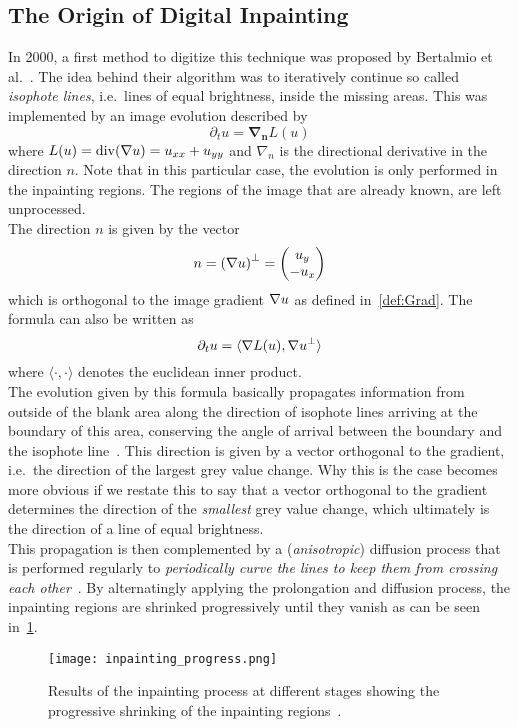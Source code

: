 \subsection{The Origin of Digital Inpainting}
In 2000, a first method to digitize this technique was proposed by Bertalmio et al.~\cite{bertalmio00}.
The idea behind their algorithm was to iteratively continue so called \textit{isophote
lines}, i.e.\ lines of equal brightness, inside the missing areas. 
This was implemented by an image evolution described by 
\begin{equation}
    \partial_t u = \mathbf{\nabla_n} L(u)  
\end{equation}
where $L(u) = \operatorname{div}(\mathbf{\nabla}  u) = u_{xx} + u_{yy}$ and $\nabla_n$ is the 
directional derivative in the direction $n$. Note that in this particular case, the evolution is
only performed in the inpainting regions. The regions of the image that are already known, are left
unprocessed. \\
The direction $n$ is given by the vector
\begin{equation}
    n = {(\mathbf{\nabla}  u)}^\bot = \begin{pmatrix}
        u_y\\-u_x
    \end{pmatrix}
\end{equation}
which is orthogonal to the image gradient $\mathbf{\nabla} u$ as defined in~\ref{def:Grad}.
The formula can also be written as 
\begin{equation}
    \partial_t u = \langle \mathbf{\nabla} L(u), \mathbf{\nabla} u^\bot\rangle
\end{equation}
where $\langle\cdot,\cdot\rangle$ denotes the euclidean inner product.\\
The evolution given by this formula basically propagates information from outside of the blank
area along the direction of isophote lines arriving at the boundary of this area, conserving the
angle of arrival between the boundary and the isophote line~\cite{bertalmio00}.
This direction is given by a vector orthogonal to the gradient, i.e.\ the direction of the largest
grey value change.
Why this is the case becomes more obvious if we restate this to say that a vector orthogonal to the gradient
determines the direction of the \textit{smallest} grey value change, which ultimately is the
direction of a line of equal brightness.\\
This propagation is then complemented by a (\textit{anisotropic}) diffusion process that is performed regularly to
\textit{periodically curve the lines to keep them from crossing each other}~\cite{bertalmio00}.
By alternatingly applying the prolongation and diffusion process, the inpainting regions are
shrinked progressively until they vanish as can be seen in~\ref{fig:InpaintingProgress}.
\begin{figure}[h]
    \centering
    \texttt{[image: inpainting\_progress.png]}
    \caption{Results of the inpainting process at different stages showing the progressive
    shrinking of the inpainting regions~\cite{bertalmio00}.}\label{fig:InpaintingProgress}
\end{figure}
\newpage\noindent

